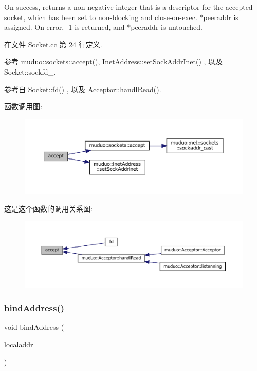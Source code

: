 On success, returns a non-\/negative integer that is a descriptor for the accepted socket, which has been set to non-\/blocking and close-\/on-\/exec. $\ast$peeraddr is assigned. On error, -\/1 is returned, and $\ast$peeraddr is untouched. 

在文件 Socket.\+cc 第 24 行定义.



参考 muduo\+::sockets\+::accept(), Inet\+Address\+::set\+Sock\+Addr\+Inet() , 以及 Socket\+::sockfd\+\_\+.



参考自 Socket\+::fd() , 以及 Acceptor\+::handl\+Read().

函数调用图\+:
\nopagebreak
\begin{figure}[H]
\begin{center}
\leavevmode
\includegraphics[width=350pt]{classmuduo_1_1Socket_a4f91f07f92cd51f6d6d4214af1e9b73f_cgraph}
\end{center}
\end{figure}
这是这个函数的调用关系图\+:
\nopagebreak
\begin{figure}[H]
\begin{center}
\leavevmode
\includegraphics[width=350pt]{classmuduo_1_1Socket_a4f91f07f92cd51f6d6d4214af1e9b73f_icgraph}
\end{center}
\end{figure}
\mbox{\label{classmuduo_1_1Socket_a5676ae95e49d9927ccf9cf7255521689}} 
\subsubsection{\texorpdfstring{bind\+Address()}{bindAddress()}}
{\footnotesize\ttfamily void bind\+Address (\begin{DoxyParamCaption}\item[{const \hyperlink{classmuduo_1_1InetAddress}{Inet\+Address} \&}]{localaddr }\end{DoxyParamCaption})}



